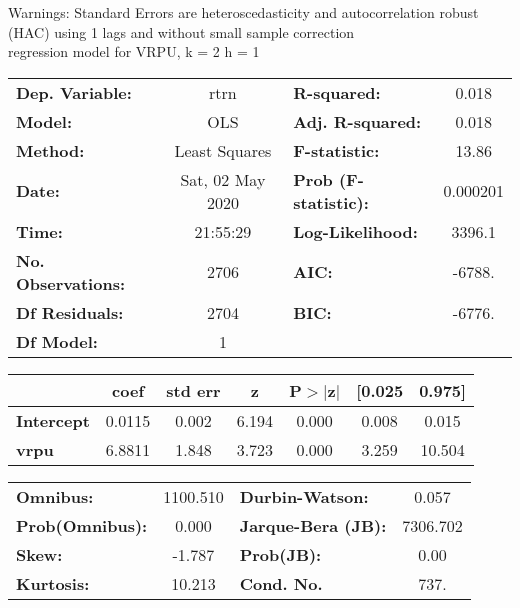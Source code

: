 Warnings: \newline
 [1] Standard Errors are heteroscedasticity and autocorrelation robust (HAC) using 1 lags and without small sample correction\\ 

regression model for VRPU, k = 2 h = 1\begin{center}
\begin{tabular}{lclc}
\toprule
\textbf{Dep. Variable:}    &       rtrn       & \textbf{  R-squared:         } &     0.018   \\
\textbf{Model:}            &       OLS        & \textbf{  Adj. R-squared:    } &     0.018   \\
\textbf{Method:}           &  Least Squares   & \textbf{  F-statistic:       } &     13.86   \\
\textbf{Date:}             & Sat, 02 May 2020 & \textbf{  Prob (F-statistic):} &  0.000201   \\
\textbf{Time:}             &     21:55:29     & \textbf{  Log-Likelihood:    } &    3396.1   \\
\textbf{No. Observations:} &        2706      & \textbf{  AIC:               } &    -6788.   \\
\textbf{Df Residuals:}     &        2704      & \textbf{  BIC:               } &    -6776.   \\
\textbf{Df Model:}         &           1      & \textbf{                     } &             \\
\bottomrule
\end{tabular}
\begin{tabular}{lcccccc}
                   & \textbf{coef} & \textbf{std err} & \textbf{z} & \textbf{P$> |$z$|$} & \textbf{[0.025} & \textbf{0.975]}  \\
\midrule
\textbf{Intercept} &       0.0115  &        0.002     &     6.194  &         0.000        &        0.008    &        0.015     \\
\textbf{vrpu}      &       6.8811  &        1.848     &     3.723  &         0.000        &        3.259    &       10.504     \\
\bottomrule
\end{tabular}
\begin{tabular}{lclc}
\textbf{Omnibus:}       & 1100.510 & \textbf{  Durbin-Watson:     } &    0.057  \\
\textbf{Prob(Omnibus):} &   0.000  & \textbf{  Jarque-Bera (JB):  } & 7306.702  \\
\textbf{Skew:}          &  -1.787  & \textbf{  Prob(JB):          } &     0.00  \\
\textbf{Kurtosis:}      &  10.213  & \textbf{  Cond. No.          } &     737.  \\
\bottomrule
\end{tabular}
\end{center}

